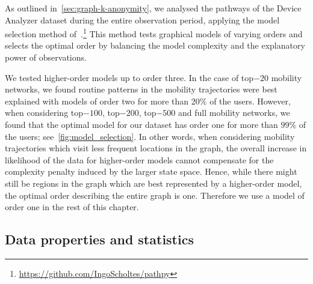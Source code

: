 As outlined in~\cref{sec:graph-k-anonymity}, we analysed the pathways of the Device Analyzer dataset during the entire observation period, applying the model selection method of~.\footnote{\url{https://github.com/IngoScholtes/pathpy}}
This method tests graphical models of varying orders and selects the optimal order by balancing the model complexity and the explanatory power of observations.

We tested higher-order models up to order three. In the case of top$-20$ mobility networks, we found routine patterns in the mobility trajectories were best explained with models of order two for more than 20$\%$ of the users. However, when considering top$-100$, top$-200$, top$-500$ and full mobility networks, we found that the optimal model for our dataset has order one for more than $ 99\% $ of the users; see~\cref{fig:model_selection}. In other words, when considering mobility trajectories which visit less frequent locations in the graph, the overall increase in likelihood of the data for higher-order models cannot compensate for the complexity penalty induced by the larger state space. Hence, while there might still be regions in the graph which are best represented by a higher-order model, the optimal order describing the entire graph is one. Therefore we use a model of order one in the rest of this chapter.

\subsection{Data properties and statistics} \label{sec:data-stats}

